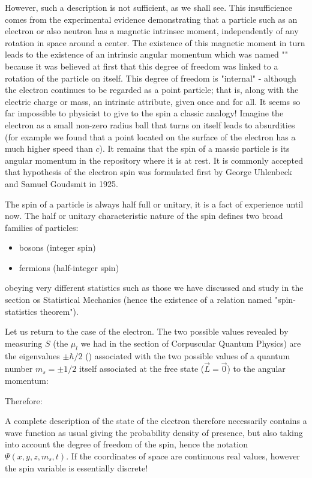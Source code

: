 	However, such a description is not sufficient, as we shall see. This insufficience comes from the experimental evidence demonstrating that a particle such as an electron or also neutron has a magnetic intrinsec moment, independently of any rotation in space around a center. The existence of this magnetic moment in turn leads to the existence of an intrinsic angular momentum which was named "" because it was believed at first that this degree of freedom was linked to a rotation of the particle on itself. This degree of freedom is "internal" - although the electron continues to be regarded as a point particle; that is, along with the electric charge or mass, an intrinsic attribute, given once and for all. It seems so far impossible to physicist to give to the spin a classic analogy! Imagine the electron as a small non-zero radius ball that turns on itself leads to absurdities (for example we found that a point located on the surface of the electron has a much higher speed than $c$). It remains that the spin of a massic particle is its angular momentum in the repository where it is at rest. It is commonly accepted that hypothesis of the electron spin was formulated first by George Uhlenbeck and  Samuel  Goudsmit in 1925.

	The spin of a particle is always half full or unitary, it is a fact of experience until now. The half or unitary characteristic nature of the spin defines two broad families of particles:
	\begin{itemize}
		\item bosons (integer spin)
		
		\item fermions (half-integer spin)
	\end{itemize}  	
	obeying very different statistics such as those we have discussed and study in the section os Statistical Mechanics (hence the existence of a relation named "spin-statistics theorem").

	Let us return to the case of the electron. The two possible values revealed by measuring $S$ (the $\mu_l$ we had in the section of Corpuscular Quantum Physics) are the eigenvalues $\pm\hbar/2$ () associated with the two possible values of a quantum number $m_s=\pm 1/2$ itself associated at the free state ($\vec{L}=\vec{0}$) to the angular momentum:
	
	Therefore:
	
	A complete description of the state of the electron therefore necessarily contains a wave function as usual giving the probability density of presence, but also taking into account the degree of freedom of the spin, hence the notation $\Psi(x,y,z,m_s,t)$. If the coordinates of space are continuous real values, however the spin variable is essentially discrete!
	
